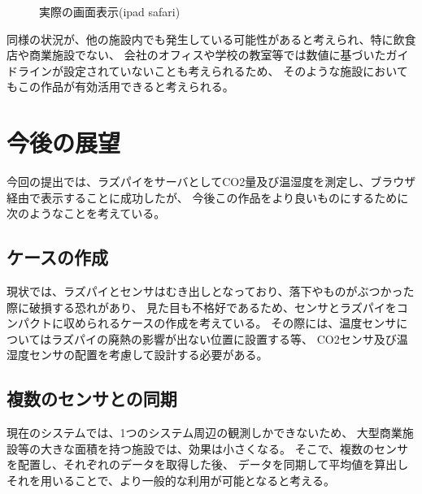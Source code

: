\documentclass[a4paper]{jsarticle}
\begin{document}
\begin{figure}[htbp]
    \begin{center}
        \caption{実際の画面表示(ipad safari)}
    \end{center}
\end{figure}
同様の状況が、他の施設内でも発生している可能性があると考えられ、特に飲食店や商業施設でない、
会社のオフィスや学校の教室等では数値に基づいたガイドラインが設定されていないことも考えられるため、
そのような施設においてもこの作品が有効活用できると考えられる。
\section{今後の展望}
今回の提出では、ラズパイをサーバとしてCO2量及び温湿度を測定し、ブラウザ経由で表示することに成功したが、
今後この作品をより良いものにするために次のようなことを考えている。
\subsection{ケースの作成}
現状では、ラズパイとセンサはむき出しとなっており、落下やものがぶつかった際に破損する恐れがあり、
見た目も不格好であるため、センサとラズパイをコンパクトに収められるケースの作成を考えている。
その際には、温度センサについてはラズパイの廃熱の影響が出ない位置に設置する等、
CO2センサ及び温湿度センサの配置を考慮して設計する必要がある。
\subsection{複数のセンサとの同期}
現在のシステムでは、1つのシステム周辺の観測しかできないため、
大型商業施設等の大きな面積を持つ施設では、効果は小さくなる。
そこで、複数のセンサを配置し、それぞれのデータを取得した後、
データを同期して平均値を算出しそれを用いることで、より一般的な利用が可能となると考える。
\end{document}
